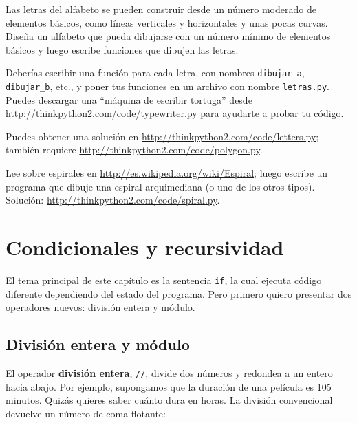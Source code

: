 \documentclass[10pt]{book}
\begin{document}
\begin{exercise}

Las letras del alfabeto se pueden construir desde un número moderado
de elementos básicos, como líneas verticales y horizontales y unas pocas
curvas.  Diseña un alfabeto que pueda dibujarse con un número
mínimo de elementos básicos y luego escribe funciones que dibujen las letras.

Deberías escribir una función para cada letra, con nombres
\verb"dibujar_a", \verb"dibujar_b", etc., y poner tus funciones
en un archivo con nombre {\tt letras.py}.  Puedes descargar una
``máquina de escribir tortuga'' desde \url{http://thinkpython2.com/code/typewriter.py}
para ayudarte a probar tu código.

Puedes obtener una solución en \url{http://thinkpython2.com/code/letters.py};
también requiere
\url{http://thinkpython2.com/code/polygon.py}.

\end{exercise}

\begin{exercise}

Lee sobre espirales en \url{http://es.wikipedia.org/wiki/Espiral}; luego
escribe un programa que dibuje una espiral arquimediana (o uno de los otros
tipos).  Solución: \url{http://thinkpython2.com/code/spiral.py}.

\end{exercise}


\chapter{Condicionales y recursividad}

El tema principal de este capítulo es la sentencia {\tt if}, la cual
ejecuta código diferente dependiendo del estado del programa.
Pero primero quiero presentar dos operadores nuevos: división entera
y módulo.


\section{División entera y módulo}

El operador {\bf división entera}, \verb"//", divide
dos números y redondea a un entero hacia abajo.  Por ejemplo, supongamos que la
duración de una película es 105 minutos.  Quizás quieres saber
cuánto dura en horas.  La división convencional
devuelve un número de coma flotante:
\end{document}
